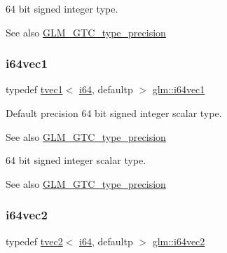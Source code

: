 64 bit signed integer type. \begin{DoxySeeAlso}{See also}
\hyperlink{group__gtc__type__precision}{G\+L\+M\+\_\+\+G\+T\+C\+\_\+type\+\_\+precision} 
\end{DoxySeeAlso}
\mbox{\label{group__gtc__type__precision_ga7ee2c91a98ebd719ae26e15ad89106de}} 
\subsubsection{\texorpdfstring{i64vec1}{i64vec1}}
{\footnotesize\ttfamily typedef \hyperlink{structglm_1_1tvec1}{tvec1}$<$ \hyperlink{group__gtc__type__precision_gac7a7eaad46064fc952b06df33689da23}{i64}, defaultp $>$ \hyperlink{group__gtc__type__precision_ga7ee2c91a98ebd719ae26e15ad89106de}{glm\+::i64vec1}}

Default precision 64 bit signed integer scalar type. \begin{DoxySeeAlso}{See also}
\hyperlink{group__gtc__type__precision}{G\+L\+M\+\_\+\+G\+T\+C\+\_\+type\+\_\+precision}
\end{DoxySeeAlso}
64 bit signed integer scalar type. \begin{DoxySeeAlso}{See also}
\hyperlink{group__gtc__type__precision}{G\+L\+M\+\_\+\+G\+T\+C\+\_\+type\+\_\+precision} 
\end{DoxySeeAlso}
\mbox{\label{group__gtc__type__precision_ga5a03cb457be28a9a8b9e61163fe648a1}} 
\subsubsection{\texorpdfstring{i64vec2}{i64vec2}}
{\footnotesize\ttfamily typedef \hyperlink{structglm_1_1tvec2}{tvec2}$<$ \hyperlink{group__gtc__type__precision_gac7a7eaad46064fc952b06df33689da23}{i64}, defaultp $>$ \hyperlink{group__gtc__type__precision_ga5a03cb457be28a9a8b9e61163fe648a1}{glm\+::i64vec2}}

